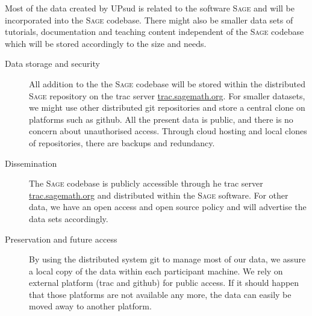 \documentclass[12pt]{article}
\newcommand{\software}[1]{\textsc{#1}\xspace}
\newcommand{\Sage}{\software{Sage}}
\begin{document}
Most of the data created by UPsud is related to the software \Sage and will be incorporated into the \Sage codebase. There might also be smaller data sets of tutorials, documentation and teaching content independent of the \Sage codebase which will be stored accordingly to the size and needs.
\begin{description}
\item[Data storage and security] All addition to the the \Sage codebase will be stored within the distributed \Sage repository on the trac server \href{http://trac.sagemath.org/}{trac.sagemath.org}. For smaller datasets, we might use other distributed git repositories and store a central clone on platforms such as github. All the present data is public, and there is no concern about
unauthorised access. Through cloud hosting and local clones of
repositories, there are backups and redundancy.
\item[Dissemination] The \Sage codebase is publicly accessible through he trac server \href{http://trac.sagemath.org/}{trac.sagemath.org} and distributed within the \Sage software. For other data, we have an open access and open source policy and will advertise the data sets accordingly.
\item[Preservation and future access] By using the distributed system git to manage most of our data, we assure a local copy of the data within each participant machine. We rely on external platform (trac and github) for public access. If it should happen that those platforms are not available any more, the data can easily be moved away to another platform.
\end{description}
\end{document}
